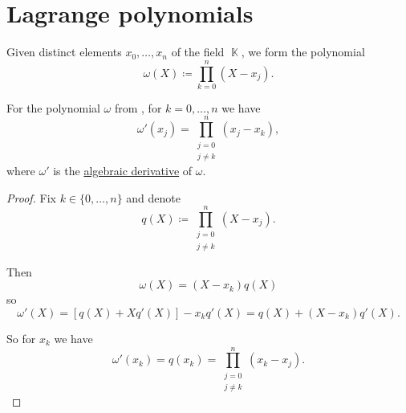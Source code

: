 \section{Lagrange polynomials}\label{sec:lagrange_polynomials}

\begin{definition}\label{def:omega_polynomial}
  Given distinct elements \( x_0, \ldots, x_n \) of the field \( \BbbK \), we form the polynomial
  \begin{equation*}
    \omega(X) \coloneqq \prod_{k=0}^n (X - x_j).
  \end{equation*}
\end{definition}

\begin{proposition}\label{thm:omega_polynomial_derivative}
  For the polynomial \( \omega \) from , for \( k = 0, \ldots, n \) we have
  \begin{equation*}
    \omega'(x_j) = \prod_{\substack{j = 0 \\ j \neq k}}^n (x_j - x_k),
  \end{equation*}
  where \( \omega' \) is the \hyperref[def:algebraic_derivative]{algebraic derivative} of \( \omega \).
\end{proposition}
\begin{proof}
  Fix \( k \in \{ 0, \ldots, n \} \) and denote
  \begin{equation*}
    q(X) \coloneqq \prod_{\substack{j = 0 \\ j \neq k}}^n (X - x_j).
  \end{equation*}

  Then
  \begin{equation*}
    \omega(X) = (X - x_k) q(X)
  \end{equation*}
  so
  \begin{equation*}
    \omega'(X) = [q(X) + X q'(X)] - x_k q'(X) = q(X) + (X - x_k) q'(X).
  \end{equation*}

  So for \( x_k \) we have
  \begin{equation*}
    \omega'(x_k) = q(x_k) = \prod_{\substack{j = 0 \\ j \neq k}}^n (x_k - x_j).
  \end{equation*}
\end{proof}

